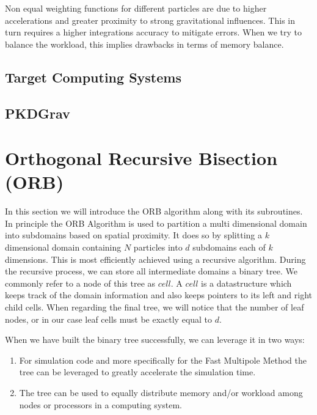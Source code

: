 \documentclass[]{article}
\begin{document}
Non equal weighting functions for different particles are due to higher accelerations and greater proximity to strong gravitational influences. This in turn requires a higher integrations accuracy to mitigate errors. When we try to balance the workload, this implies drawbacks in terms of memory balance. 



\subsection{Target Computing Systems}\label{section:target-systems}


\subsection{PKDGrav}


\newpage
\section{Orthogonal Recursive Bisection (ORB)}


In this section we will introduce the ORB algorithm along with its subroutines.
In principle the ORB Algorithm is used to partition a multi dimensional domain into subdomains based on spatial proximity. It does so by splitting a $k$ dimensional domain containing $N$ particles into $d$ subdomains each of $k$ dimensions. This is most efficiently achieved using a recursive algorithm. During the recursive process, we can store all intermediate domains a binary tree. We commonly refer to a node of this tree as $cell$. A $cell$ is a datastructure which keeps track of the domain information and also keeps pointers to its left and right child cells. When regarding the final tree, we will notice that the number of leaf nodes, or in our case leaf cells must be exactly equal to $d$. 

When we have built the binary tree successfully, we can leverage it in two ways:

\begin{enumerate}
	\item For simulation code and more specifically for the Fast Multipole Method the tree can be leveraged to greatly accelerate the simulation time. 
	\item The tree can be used to equally distribute memory and/or workload among nodes or processors in a computing system. 
\end{enumerate} 
\end{document}
